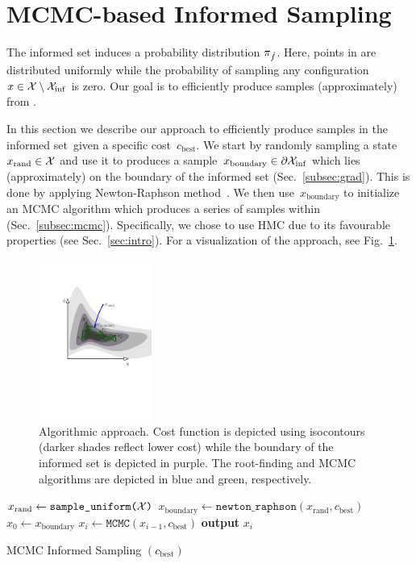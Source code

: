 \documentclass[letterpaper, 10 pt, conference]{ieeeconf}  %
\begin{document}
\section{MCMC-based Informed Sampling}
The informed set induces a probability distribution $\pi_{\hat{f}}$. 
Here, points in \Cinf are distributed uniformly
while 
the probability of sampling any configuration $x \in \mathcal{X} \setminus \mathcal{X}_{\rm {inf}}$ is zero.
Our goal is to efficiently produce samples (approximately) from \Pinf.



In this section we describe our approach to efficiently produce samples in the informed set~\Cinf given a specific cost~$c_{\text{best}}$.
We start  by randomly sampling a state~$x_\text{rand} \in \mathcal{X}$ and use it
to produces a sample~$x_\text{boundary} \in \partial\mathcal{X}_{\rm {inf}}$ which lies (approximately) on the boundary of the informed set (Sec.~\ref{subsec:grad}).
This is done by applying Newton-Raphson method~\cite{RT06}.
We then use~$x_\text{boundary}$ to initialize an MCMC algorithm which produces a series of samples within \Cinf (Sec.~\ref{subsec:mcmc}). Specifically, we chose to use HMC due to its favourable properties (see Sec.~\ref{sec:intro}). 
For a visualization of the approach, see Fig.~\ref{fig:alg}.

\begin{figure}[tb]
  \centering
  	\includegraphics[trim={4.5cm 0 4cm 2cm},clip,height = 5.25cm ]{fig/alg.pdf}
  \caption{
    \captionstyle
  	Algorithmic approach.
  	Cost function is depicted using isocontours (darker shades reflect lower cost) while the boundary of the informed set is depicted in purple. 
  	The root-finding and MCMC algorithms are depicted in blue and green, respectively.
  	}
   	\label{fig:alg}
\end{figure}

\begin{algorithm}[t]
	\begin{algorithmic}[1]
		\STATE $x_{\text{rand}} \leftarrow \texttt{sample\_uniform(\ensuremath{\mathcal{X}})}$
		\STATE $x_{\text{boundary}} \leftarrow
		 \texttt{newton\_raphson}(x_{\text{rand}}, c_{\text{best}})$
		\STATE $x_{0} \leftarrow x_{\text{boundary}}$
			\STATE $x_{i} \leftarrow \texttt{MCMC} (x_{i-1}, c_{\text{best}})$
			\STATE \textbf{output} $x_{i}$
		\ENDFOR
		 
   	\end{algorithmic}
	\caption{MCMC Informed Sampling $(c_{\text{best}})$}
	\label{alg:mcmc_informed_sampling}	
\end{algorithm}
\end{document}

